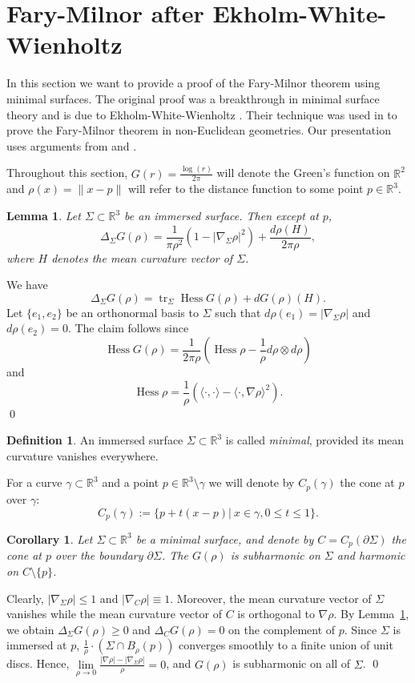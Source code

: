 \documentclass[a4paper,12pt]{amsart}
\numberwithin{equation}{section}
\def\Hess{\operatorname{Hess}}
\def\tr{\operatorname{tr}}
\def\D{\partial}
\def\R{\mathbb R}
\def\ga{\gamma}
\def\Si{\Sigma}
\def\<{\langle}
\def\>{\rangle}
\theoremstyle{plain}
\newtheorem{lem}[thm]{Lemma}
\newtheorem{cor}[thm]{Corollary}
\theoremstyle{named}
\theoremstyle{definition}
\newtheorem{dfn}[thm]{Definition}
\theoremstyle{remark}
\newcommand{\bcor}{\begin{cor}}
\newcommand{\ecor}{\end{cor}}
\newcommand{\bdfn}{\begin{dfn}}
\newcommand{\edfn}{\end{dfn}}
\newcommand{\blem}{\begin{lem}}
\newcommand{\elem}{\end{lem}}
\begin{document}
\section{Fary-Milnor after Ekholm-White-Wienholtz}

In this section we want to provide a proof of the Fary-Milnor theorem using minimal surfaces.
The original proof was a breakthrough in minimal surface theory and is due to Ekholm-White-Wienholtz \cite{EWW_embed}. 
Their technique was used in \cite{CG_embed, St_structure} to prove the Fary-Milnor theorem in
non-Euclidean geometries. Our presentation uses arguments from \cite{EWW_embed} and \cite{CG_embed}.
\medskip

Throughout this section, $G(r)=\frac{\log(r)}{2\pi}$ will denote the Green's function on $\R^2$ and  $\rho(x)=\|x-p\|$ will refer to
the distance function to some point $p\in\R^3$.

\blem\label{lem_laplace} 
Let $\Si\subset \R^3$ be an immersed surface. Then except at $p$,
\[\Delta_\Si G(\rho)=\frac{1}{\pi\rho^2}(1-|\nabla_\Si \rho|^2)+\frac{d\rho(H)}{2\pi\rho},\]
where $H$ denotes the mean curvature vector of $\Si$. 
\elem

\proof
We have
\[\Delta_\Si G(\rho)=\tr_\Si\Hess G(\rho)+d G(\rho)(H).\]
Let $\{e_1,e_2\}$ be an orthonormal basis to $\Si$ such that $d\rho(e_1)=|\nabla_\Si \rho|$ and $d\rho(e_2)=0$. 
The claim follows since 
\[\Hess G(\rho)=\frac{1}{2\pi\rho}(\Hess\rho-\frac{1}{\rho}d\rho\otimes d\rho)\] 
and
\[\Hess\rho=\frac{1}{\rho}(\<\cdot,\cdot\>-\<\cdot,\nabla\rho\>^2).\]
\qed

\bdfn
An immersed surface $\Si\subset\R^3$ is called {\em minimal}, provided its mean curvature vanishes everywhere.
\edfn
For a curve $\ga\subset\R^3$ and a point $p\in\R^3\setminus\ga$ we will denote by $C_p(\ga)$ the cone at $p$
over $\ga$:
\[C_p(\ga):=\{p+t(x-p)|\ x\in\ga, 0\leq t\leq 1\}.\]
\medskip

\bcor\label{cor_subhar}
Let $\Si\subset\R^3$ be a minimal surface, and denote by $C=C_p(\D\Si)$ the cone at $p$ over the boundary $\D\Si$.
The $G(\rho)$ is subharmonic on $\Si$ and harmonic on $C\setminus\{p\}$.
\ecor

\proof
Clearly, $|\nabla_\Si\rho|\leq 1$ and $|\nabla_C\rho|\equiv 1$.
Moreover, the mean curvature vector of $\Si$ vanishes while the mean curvature vector of $C$
is orthogonal to $\nabla\rho$. By Lemma~\ref{lem_laplace}, we obtain $\Delta_\Si G(\rho)\geq 0$ and $\Delta_C G(\rho)= 0$
on the complement of $p$. Since $\Si$ is immersed at $p$, $\frac{1}{\rho}\cdot(\Si\cap B_\rho(p))$
converges smoothly to a finite union of unit discs. Hence, $\lim\limits_{\rho\to 0}\frac{|\nabla\rho|-|\nabla_\Si\rho|}{\rho}=0$, and
$G(\rho)$ is subharmonic on all of $\Si$.
\qed
\end{document}
